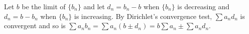 \documentclass[12pt]{article}
\begin{document}
Let $b$ be the limit of $\{b_n\}$ and let $d_n=b_n-b$ when $\{b_n\}$ is decreasing and $d_n=b-b_n$ when $\{b_n\}$ is increasing. By Dirichlet's convergence test, $\sum a_nd_n$ is convergent and so is $\sum a_nb_n = \sum a_n(b\pm d_n) = b\sum a_n \pm \sum a_nd_n$.
\end{document}
